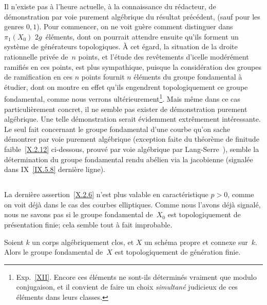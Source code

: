 \begin{remarques}
\label{X.2.7}
Il n'existe pas \`a l'heure actuelle, \`a la connaissance du
r\'edacteur, de d\'e\-mon\-stra\-tion par voie purement
alg\'ebrique du r\'esultat pr\'ec\'edent, (sauf pour les genres
$0,1$). Pour commencer, on ne voit gu\`ere comment distinguer dans
$\pi_1(X_0)$ $2g$~\'el\'ements, dont on pourrait attendre ensuite
qu'ils forment un syst\`eme de g\'en\'erateurs
topologiques. \`A cet \'egard, la situation de la droite
rationnelle priv\'ee de~$n$ points, et l'\'etude des
rev\^etements d'icelle mod\'er\'ement ramifi\'es en ces
points, est plus sympathique, puisque la consid\'eration des groupes
de ramification en ces $n$ points fournit $n$ \'el\'ements du
groupe fondamental \`a \'etudier, dont on montre en effet qu'ils
engendrent topologiquement ce groupe fondamental, comme nous verrons
ult\'erieurement\footnote{\Cf Exp.\, \ref{XII}. Encore ces
\'el\'ements ne sont-ils d\'etermin\'es vraiment que modulo
conjugaison, et il convient de faire un choix \emph{simultané}
judicieux de ces \'el\'ements dans leurs classes.}. Mais m\^eme
dans ce cas particuli\`erement concret, il ne semble pas exister de
d\'emonstration purement alg\'ebrique. Une telle
d\'emonstration serait \'evidemment extr\^emement
int\'eressante. Le seul fait concernant le groupe fondamental d'une
courbe qu'on sache d\'emontrer par voie purement alg\'ebrique
(exception faite du th\'eor\`eme de finitude faible~\ref{X.2.12}
ci-dessous, prouv\'e par voie alg\'ebrique par Lang-Serre~\cite{X.2}),
semble la d\'etermination du groupe fondamental rendu ab\'elien
via la jacobienne (signal\'ee dans IX~\ref{IX.5.8} derni\`ere
ligne).
\end{remarques}

\subsection{}
\label{X.2.8}
La derni\`ere assertion~\ref{X.2.6} n'est plus valable en
caract\'eristique $p>0$, comme on voit d\'ej\`a dans le cas des
courbes elliptiques. Comme nous l'avons d\'ej\`a signal\'e, nous
ne savons pas si le groupe fondamental de~$X_0$ est topologiquement de
pr\'esentation finie; cela semble tout \`a fait improbable.

\begin{theoreme}
\label{X.2.9}
Soient $k$ un corps alg\'ebriquement clos, et $X$ un sch\'ema
propre et connexe sur~$k$. Alors le groupe fondamental de~$X$ est
topologiquement de g\'en\'eration finie.
\end{theoreme}

